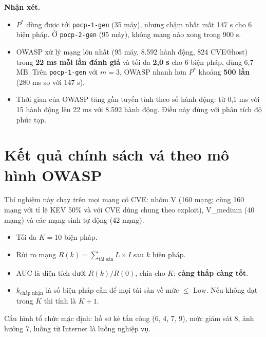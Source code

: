 \documentclass[11pt,a4paper]{article}
\begin{document}
\textbf{Nhận xét.}
\begin{itemize}
  \item $P^{*}$ dùng được tới \texttt{pocp-1-gen} (35 máy), nhưng chậm nhất mất 147 s cho 6 biện pháp. Ở \texttt{pocp-2-gen} (95 máy), không mạng nào xong trong 900 s.
  \item OWASP xử lý mạng lớn nhất (95 máy, 8.592 hành động, 824 CVE@host) trong \textbf{22 ms mỗi lần đánh giá} và tối đa \textbf{2,0 s} cho 6 biện pháp, dùng 6,7 MB. Trên \texttt{pocp-1-gen} với $m = 3$, OWASP nhanh hơn $P^{*}$ khoảng \textbf{500 lần} (280 ms so với 147 s).
  \item Thời gian của OWASP tăng gần tuyến tính theo số hành động: từ 0,1 ms với 15 hành động lên 22 ms với 8.592 hành động. Điều này đúng với phân tích độ phức tạp.
\end{itemize}

\section{Kết quả chính sách vá theo mô hình OWASP}

Thí nghiệm này chạy trên mọi mạng có CVE: nhóm V (160 mạng; cùng 160 mạng với tỉ lệ KEV 50\% và với CVE dùng chung theo exploit), V\_medium (40 mạng) và các mạng sinh tự động (42 mạng).
\begin{itemize}
  \item Tối đa $K = 10$ biện pháp.
  \item Rủi ro mạng $R(k) = \sum_{\text{tài sản}} L \times I$ sau $k$ biện pháp.
  \item AUC là diện tích dưới $R(k)/R(0)$, chia cho $K$; \textbf{càng thấp càng tốt}.
  \item $k_{\text{chấp nhận}}$ là số biện pháp cần để mọi tài sản về mức $\le$ Low. Nếu không đạt trong $K$ thì tính là $K + 1$.
\end{itemize}
Cấu hình tổ chức mặc định: hồ sơ kẻ tấn công (6, 4, 7, 9), mức giám sát 8, ảnh hưởng 7, luồng từ Internet là luồng nghiệp vụ.
\end{document}
